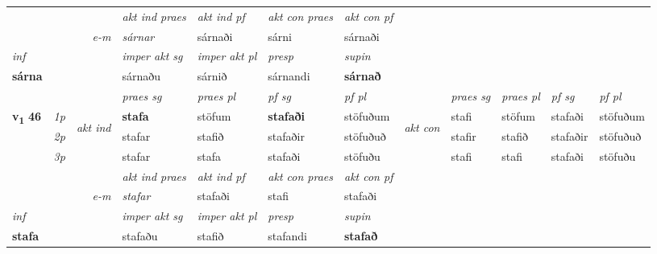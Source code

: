 \begin{longtable}[l]{X>{\footnotesize\itshape}llXXXXlXXXX}
   && &  \textit{akt ind praes} & \textit{akt ind pf} & \textit{akt con praes} & \textit{akt con pf} \\*
\multicolumn{3}{r}{\textit{e-m}} & sárnar & sárnaði & sárni & sárnaði \\*

\cmidrule{4-7}
   {\textit{inf}} & &  & \textit{imper akt sg} & \textit{imper akt pl}   & \textit{presp} & \textit{supin}   \\*
  {\textbf{sárna}} & && sárnaðu  & sárnið   & sárnandi &  \textbf{sárnað}   \\*

\midrule

 & &   & \textit{praes sg}  & \textit{praes pl}    & \textit{ pf sg} & \textit{pf pl} & & \textit{praes sg}  & \textit{praes pl}    & \textit{pf sg} & \textit{pf pl }  \\ \cmidrule{4-7} \cmidrule{9-12}
 \multirow{2}{*}{{{\textbf{v{\textsubscript{1}}} \Large{\textbf{46}}}}}  & 1p & \multirow{3}{*}{\begin{turn}{90}\textit{akt ind}\end{turn}} & \textbf{stafa} & stöfum & \textbf{stafaði} & stöfuðum & \multirow{3}{*}{\begin{turn}{90}\textit{akt con}\end{turn}} &stafi & stöfum & stafaði & stöfuðum\\*
 & 2p &  &  stafar  & stafið & stafaðir & stöfuðuð & & stafir & stafið & stafaðir & stöfuðuð \\*
 & 3p &  & stafar & stafa & stafaði & stöfuðu & & stafi & stafi& stafaði & stöfuðu \\*
\cmidrule{4-7} \cmidrule{9-12}

   && &  \textit{akt ind praes} & \textit{akt ind pf} & \textit{akt con praes} & \textit{akt con pf} \\*
\multicolumn{3}{r}{\textit{e-m}} & stafar & stafaði & stafi & stafaði \\*

\cmidrule{4-7}
   {\textit{inf}} & &  & \textit{imper akt sg} & \textit{imper akt pl}   & \textit{presp} & \textit{supin}   \\*
  {\textbf{stafa}} & && stafaðu  & stafið   & stafandi &  \textbf{stafað}   \\*

\midrule


\end{longtable}
